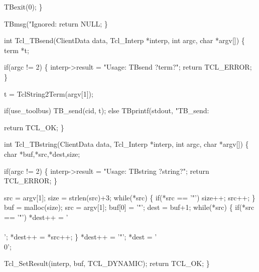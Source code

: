     TBexit(0);
  \}

  TBmsg("Ignored: %
  return NULL;
\}
\nwendcode{}\nwdocspar



\nwenddocs{}\endmoddef\let\nwnotused=\nwoutput{}
int Tcl_TBsend(ClientData data, Tcl_Interp *interp, int argc, char *argv[])
\{
  term *t;

  if(argc != 2) \{
    interp->result = "Usage: TBsend ?term?";
    return TCL_ERROR;
  \}

  t = TclString2Term(argv[1]);

  if(use_toolbus)
    TB_send(cid, t);
  else
    TBprintf(stdout, "TB_send: %

  return TCL_OK;
\}
\nwendcode{}\nwdocspar


\nwenddocs{}\endmoddef\let\nwnotused=\nwoutput{}
int Tcl_TBstring(ClientData data, Tcl_Interp *interp, int argc, char *argv[])
\{
  char *buf,*src,*dest,size;

  if(argc != 2) \{
    interp->result = "Usage: TBstring ?string?";
    return TCL_ERROR;
  \}

  src = argv[1];
  size = strlen(src)+3;
  while(*src) \{
    if(*src == '"')
      size++;
    src++;
  \}
  buf = malloc(size);
  src = argv[1];
  buf[0] = '"';
  dest = buf+1;
  while(*src) \{
    if(*src == '"')
      *dest++ = '\\\\';
    *dest++ = *src++;
  \}
  *dest++ = '"';
  *dest = '\\0';
  
  Tcl_SetResult(interp, buf, TCL_DYNAMIC);
  return TCL_OK;
\}
\nwendcode{}\nwdocspar

